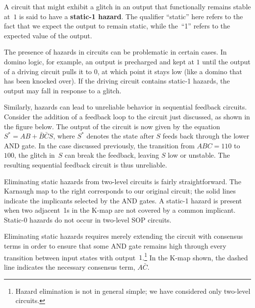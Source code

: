 A circuit that might exhibit a glitch in an output that functionally
remains stable at~$1$ is said to have a {\bf static-1 hazard}.  The
qualifier ``static'' here refers to the fact that we expect the output
to remain static, while the~``1'' refers to the expected value of the
output.



The presence of hazards in circuits can be problematic in certain
cases.  In domino logic, for example, an output is precharged and kept
at $1$ until the output of a driving circuit pulls it to $0$, at which
point it stays low (like a domino that has been knocked over).  If the
driving circuit contains \mbox{static-1} hazards, the output may fall
in response to a glitch.

Similarly, hazards can lead to unreliable behavior in sequential
feedback circuits.  Consider the addition of a feedback loop to the
circuit just discussed, as shown in the figure below.  The output of
the circuit is now given by the equation $S^*=AB+\bar{B}\bar{C}S$,
where $S^*$ denotes the state after $S$ feeds back through the lower
AND gate.  In the case discussed previously, the transition from
$ABC=110$ to $100$, the glitch in~$S$ can break the feedback, leaving
$S$ low or unstable.  The resulting sequential feedback circuit is
thus unreliable. \\ 

\centerline{}\vspace{12pt}

\begin{minipage}{5.25in}
Eliminating static hazards from \mbox{two-level} circuits
is fairly straightforward.  The Karnaugh map to the right corresponds
to our original circuit; the solid lines indicate the 
implicants selected by the AND gates.  A \mbox{static-1} hazard is
present when two adjacent~1s in the \mbox{K-map} are not covered by
a common implicant.  \mbox{Static-0} hazards do not occur in
\mbox{two-level} SOP circuits.
\end{minipage}\hspace{.25in}%
\begin{minipage}{1in}
\vspace{12pt}
\end{minipage}\vspace{4pt}

Eliminating static hazards requires merely extending the circuit with
consensus terms in order to ensure that some AND gate remains high
through every transition between input states with
output~$1$.\footnote{Hazard elimination is not in general simple; we
have considered only \mbox{two-level} circuits.}  In the
\mbox{K-map} shown, the dashed line indicates the necessary
consensus term, $A\bar{C}$.



